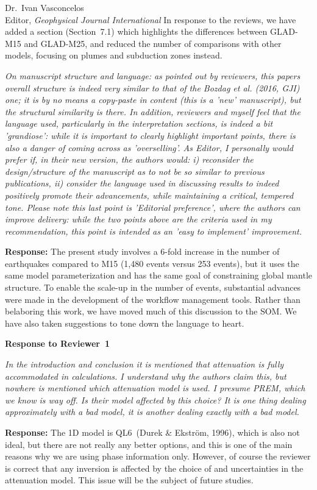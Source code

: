 \documentclass[11pt,a4paper]{letter}
\newcommand{\response}[1]{\textbf{Response:} #1}
\newcommand{\rev}[1]{{\it{#1}}}
\begin{document}
\begin{letter}{Dr.~Ivan Vasconcelos\\
Editor, \textit{Geophysical Journal International}}
{In response to the reviews,
we have added a section (Section~7.1) which highlights the differences between GLAD-M15 and GLAD-M25,
and reduced the number of comparisons with other models, focusing on plumes and subduction zones instead.
}

\rev{On manuscript structure and language: as pointed out by reviewers, this papers overall structure is indeed very similar to that of the Bozdag et al. (2016, GJI) one; it is by no means a copy-paste in content (this is a 'new' manuscript), but the structural similarity is there. In addition, reviewers and myself feel that the language used, particularly in the interpretation sections, is indeed a bit 'grandiose': while it is important to clearly highlight important points, there is also a danger of coming across as 'overselling'. As Editor, I personally would prefer if, in their new version, the authors would: i) reconsider the design/structure of the manuscript as to not be so similar to previous publications, ii) consider the language used in discussing results to indeed positively promote their advancements, while maintaining a critical, tempered tone. Please note this last point is 'Editorial preference', where the authors can improve delivery: while the two points above are the criteria used in my recommendation, this point is intended as an 'easy to implement' improvement.
}

\response{The present study involves a 6-fold increase in the number of earthquakes compared to M15 (1,480 events versus 253 events), but it uses the same model parameterization and has the same goal of constraining global mantle structure.
To enable the scale-up in the number of events, substantial advances were made in the development of the workflow management tools.
Rather than belaboring this work, we have moved much of this discussion to the SOM.
We have also taken suggestions to tone down the language to heart.
}

{\textbf{\large{Response to Reviewer~1}}}

\rev{In the introduction and conclusion it is mentioned that attenuation is fully accommodated in calculations.
I understand why the authors claim this, but nowhere is mentioned which attenuation model is used. I presume PREM, which we know is way off.
Is their model affected by this choice?
It is one thing dealing approximately with a bad model, it is another dealing exactly with a bad model.
}

\response{The 1D model is QL6~(Durek \& Ekstr\"om, 1996), which is also not ideal, but there are not really any better options,
and this is one of the main reasons why we are using phase information only.
However,
of course the reviewer is correct that any inversion is affected by the choice of and uncertainties in the attenuation model. 
This issue will be the subject of future studies.
}


\end{letter}
\end{document}
